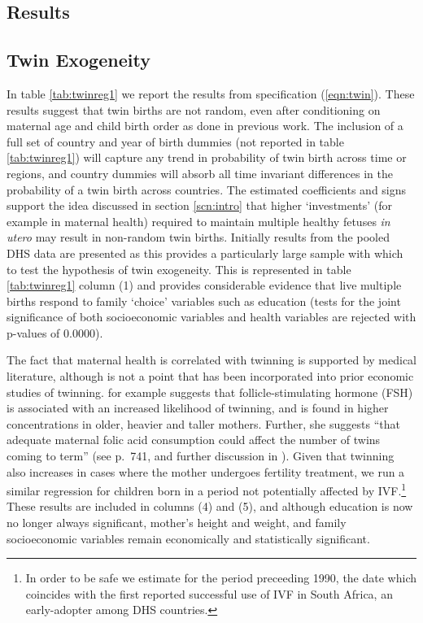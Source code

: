 \documentclass{article}[12pt,subeqn]
\begin{document}
\begin{spacing}{1.5}
\section{Results}
\label{scn:results}
\subsection{Twin Exogeneity}
\label{sscn:twinexog}
In table \ref{tab:twinreg1} we report the results from specification (\ref{eqn:twin}). These results suggest that twin births are not random, even after conditioning on maternal age and child birth order as done in previous work. The inclusion of a full set of country and year of birth dummies (not reported in table \ref{tab:twinreg1}) will capture any trend in probability of twin birth across time or regions, and country dummies will absorb all time invariant differences in the probability of a twin birth across countries.  The estimated coefficients and signs support the idea discussed in section \ref{scn:intro} that higher `investments' (for example in maternal health) required to maintain multiple healthy fetuses \emph{in utero} may result in non-random twin births. Initially results from the pooled DHS data are presented as this provides a particularly large sample with which to test the hypothesis of twin exogeneity.  This is represented in table \ref{tab:twinreg1} column (1) and provides considerable evidence that live multiple births respond to family `choice' variables such as education (tests for the joint significance of both socioeconomic variables and health variables are rejected with p-values of 0.0000).

The fact that maternal health is correlated with twinning is supported by medical literature, although is not a point that has been incorporated into prior economic studies of twinning.  \citet{Hall2003} for example suggests that follicle-stimulating hormone (FSH) is associated with an increased likelihood of twinning, and is found in higher concentrations in older, heavier and taller mothers.  Further, she suggests ``that adequate maternal folic acid consumption could affect the number of twins coming to term'' (see p.\ 741, and further discussion in \citet{Lietal2003}).  Given that twinning also increases in cases where the mother undergoes fertility treatment, we run a similar regression for children born in a period not potentially affected by IVF.\footnote{In order to be safe we estimate for the period preceeding 1990, the date which coincides with the first reported successful use of IVF in South Africa, an early-adopter among DHS countries.}  These results are included in columns (4) and (5), and although education is now no longer always significant, mother's height and weight, and family socioeconomic variables remain economically and statistically significant.


\end{spacing}
\end{document}
